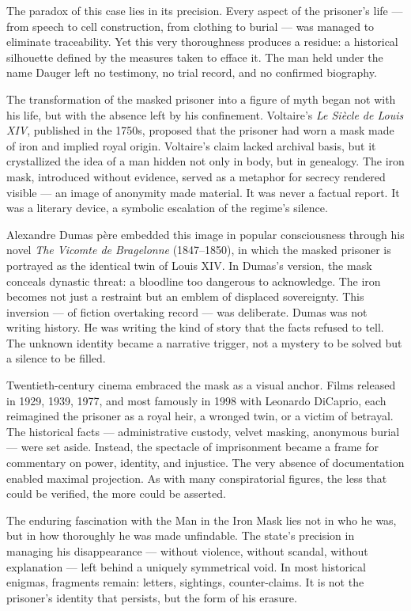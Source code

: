 The paradox of this case lies in its precision. Every aspect of the prisoner’s life — from speech to cell construction, from clothing to burial — was managed to eliminate traceability. Yet this very thoroughness produces a residue: a historical silhouette defined by the measures taken to efface it. The man held under the name Dauger left no testimony, no trial record, and no confirmed biography. 

The transformation of the masked prisoner into a figure of myth began not with his life, but with the absence left by his confinement. Voltaire’s \textit{Le Siècle de Louis XIV}, published in the 1750s, proposed that the prisoner had worn a mask made of iron and implied royal origin. Voltaire’s claim lacked archival basis, but it crystallized the idea of a man hidden not only in body, but in genealogy. The iron mask, introduced without evidence, served as a metaphor for secrecy rendered visible — an image of anonymity made material. It was never a factual report. It was a literary device, a symbolic escalation of the regime's silence.

Alexandre Dumas père embedded this image in popular consciousness through his novel \textit{The Vicomte de Bragelonne} (1847–1850), in which the masked prisoner is portrayed as the identical twin of Louis XIV. In Dumas’s version, the mask conceals dynastic threat: a bloodline too dangerous to acknowledge. The iron becomes not just a restraint but an emblem of displaced sovereignty. This inversion — of fiction overtaking record — was deliberate. Dumas was not writing history. He was writing the kind of story that the facts refused to tell. The unknown identity became a narrative trigger, not a mystery to be solved but a silence to be filled.

Twentieth-century cinema embraced the mask as a visual anchor. Films released in 1929, 1939, 1977, and most famously in 1998 with Leonardo DiCaprio, each reimagined the prisoner as a royal heir, a wronged twin, or a victim of betrayal. The historical facts — administrative custody, velvet masking, anonymous burial — were set aside. Instead, the spectacle of imprisonment became a frame for commentary on power, identity, and injustice. The very absence of documentation enabled maximal projection. As with many conspiratorial figures, the less that could be verified, the more could be asserted.

The enduring fascination with the Man in the Iron Mask lies not in who he was, but in how thoroughly he was made unfindable. The state’s precision in managing his disappearance — without violence, without scandal, without explanation — left behind a uniquely symmetrical void. In most historical enigmas, fragments remain: letters, sightings, counter-claims. It is not the prisoner’s identity that persists, but the form of his erasure.
